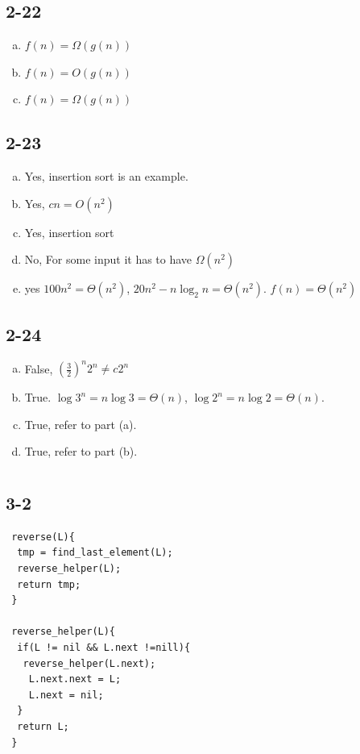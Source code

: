 \documentclass[letter]{article}
\begin{document}
\subsection*{2-22}
\begin{enumerate}[(a)]
 \item $f(n) = \Omega(g(n))$
 \item $f(n) = O(g(n))$
 \item $f(n) = \Omega(g(n))$
\end{enumerate}

\subsection*{2-23}
\begin{enumerate}[(a)]
 \item Yes, insertion sort is an example.
 \item Yes, $cn = O(n^2)$
 \item Yes, insertion sort
 \item No, For some input it has to have $\Omega(n^2)$
 \item yes $100n^2 = \Theta(n^2)$, $20n^2 - n\log_2 n = \Theta(n^2)$. $f(n) = \Theta(n^2)$
\end{enumerate}

\subsection*{2-24}
\begin{enumerate}[(a)]
 \item False, $(\frac{3}{2})^n 2^n \neq c 2^n$
 \item True. $\log 3^n = n \log 3= \Theta(n)$, $\log 2^n = n \log 2 = \Theta(n)$.
 \item True, refer to part (a).
 \item True, refer to part (b).
\end{enumerate}

\newpage
\section{}
\subsection*{3-2}
\begin{verbatim}
 reverse(L){
  tmp = find_last_element(L);
  reverse_helper(L);
  return tmp;
 }

 reverse_helper(L){
  if(L != nil && L.next !=nill){
   reverse_helper(L.next);
    L.next.next = L;
    L.next = nil;
  }
  return L;
 }
\end{verbatim} 
\end{document}
